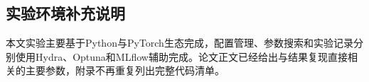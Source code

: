 %
%
%
%
%
%

\begin{appendices}
  \section{实验环境补充说明}

  本文实验主要基于Python与PyTorch生态完成，配置管理、参数搜索和实验记录分别使用Hydra、Optuna和MLflow辅助完成。论文正文已经给出与结果复现直接相关的主要参数，附录不再重复列出完整代码清单。

\end{appendices}
